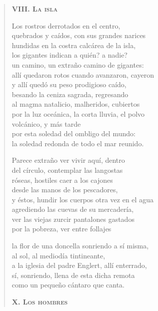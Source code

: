 \documentclass[12pt]{article}
\begin{document}
\begin{verse}
{\bfseries\scshape {VIII. La isla}}

Los rostros derrotados en el centro,\\
quebrados y caídos, con sus grandes narices\\
hundidas en la costra calcárea de la isla,\\
los gigantes indican a quién? a nadie?\\
un camino, un extraño camino de gigantes:\\
allí quedaron rotos cuando avanzaron, cayeron\\
y allí quedó su peso prodigioso caído,\\
besando la ceniza sagrada, regresando\\
al magma natalicio, malheridos, cubiertos\\
por la luz oceánica, la corta lluvia, el polvo\\
volcánico, y más tarde\\
por esta soledad del ombligo del mundo:\\
la soledad redonda de todo el mar reunido.  

Parece extraño ver vivir aquí, dentro\\
del círculo, contemplar las langostas\\
róseas, hostiles caer a los cajones\\
desde las manos de los pescadores,\\
y éstos, hundir los cuerpos otra vez en el agua\\
agrediendo las cuevas de su mercadería,\\
ver las viejas zurcir pantalones gastados\\
por la pobreza, ver entre follajes  

la flor de una doncella sonriendo a sí misma,\\
al sol, al mediodía tintineante,\\
a la iglesia del padre Englert, allí enterrado,\\
sí, sonriendo, llena de esta dicha remota\\
como un pequeño cántaro que canta.  

{\bfseries\scshape {X. Los hombres}}


\end{verse}
\end{document}
